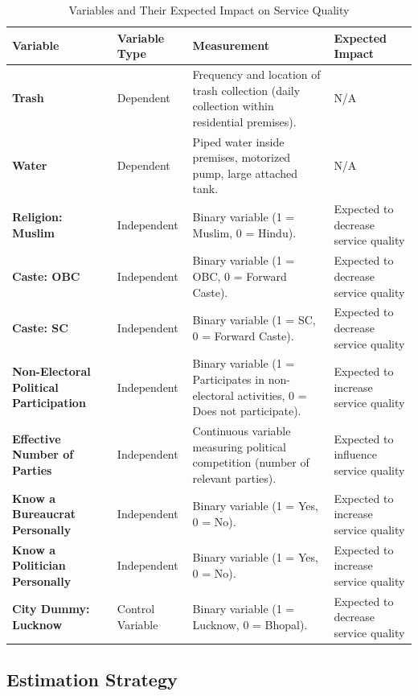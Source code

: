 \begin{table}[H]
\centering
\caption{Variables and Their Expected Impact on Service Quality}
\footnotesize  %
\begin{tabularx}{\textwidth}{>{\bfseries}p{3cm} p{2.8cm} X p{3cm}}
\toprule
\textbf{Variable} & \textbf{Variable Type} & \textbf{Measurement} & \textbf{Expected Impact} \\
\midrule
Trash & Dependent & Frequency and location of trash collection (daily collection within residential premises). & N/A \\
\addlinespace
Water & Dependent & Piped water inside premises, motorized pump, large attached tank. & N/A \\
\addlinespace
Religion: Muslim & Independent & Binary variable (1 = Muslim, 0 = Hindu). & Expected to decrease service quality \\
\addlinespace
Caste: OBC & Independent & Binary variable (1 = OBC, 0 = Forward Caste). & Expected to decrease service quality \\
\addlinespace
Caste: SC & Independent & Binary variable (1 = SC, 0 = Forward Caste). & Expected to decrease service quality \\
\addlinespace
Non-Electoral Political Participation & Independent & Binary variable (1 = Participates in non-electoral activities, 0 = Does not participate). & Expected to increase service quality \\
\addlinespace
Effective Number of Parties & Independent & Continuous variable measuring political competition (number of relevant parties). & Expected to influence service quality \\
\addlinespace
Know a Bureaucrat Personally & Independent & Binary variable (1 = Yes, 0 = No). & Expected to increase service quality \\
\addlinespace
Know a Politician Personally & Independent & Binary variable (1 = Yes, 0 = No). & Expected to increase service quality \\
\addlinespace
City Dummy: Lucknow & Control Variable & Binary variable (1 = Lucknow, 0 = Bhopal). & Expected to decrease service quality \\
\bottomrule
\end{tabularx}
\end{table}


\subsection{Estimation Strategy}

